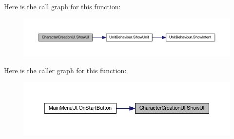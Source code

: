 Here is the call graph for this function\+:\nopagebreak
\begin{figure}[H]
\begin{center}
\leavevmode
\includegraphics[width=350pt]{class_character_creation_u_i_a5e683c30d28a4c97d8f84de3de2062cd_cgraph}
\end{center}
\end{figure}
Here is the caller graph for this function\+:\nopagebreak
\begin{figure}[H]
\begin{center}
\leavevmode
\includegraphics[width=350pt]{class_character_creation_u_i_a5e683c30d28a4c97d8f84de3de2062cd_icgraph}
\end{center}
\end{figure}
